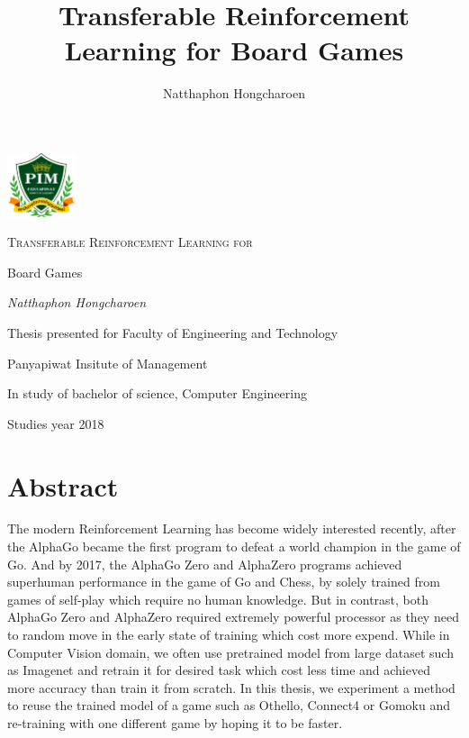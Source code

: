 \documentclass[12pt,a4paper]{article}
\title{Transferable Reinforcement Learning for Board Games}
\author{Natthaphon Hongcharoen}
\begin{document}

\begin{titlepage}
	\centering
	\includegraphics[width=0.15\textwidth]{logo.png}\par\vspace{1cm}
	{\scshape\Huge Transferable Reinforcement Learning for \par Board Games\par}
	\vfill
	{\Large\itshape Natthaphon Hongcharoen\par}
	\vfill
	{\Large  \par}
	{\large Thesis presented for Faculty of Engineering and Technology \par\vspace{0.1cm}}
	{\large Panyapiwat Insitute of Management\par\vspace{0.1cm}}
	{\large In study of bachelor of science, Computer Engineering
	}


	{\large Studies year 2018 \par}
\end{titlepage}

\clearpage %
\pagestyle{empty}  %

\section*{Abstract}
\tab\hspace{0.3cm}The modern Reinforcement Learning has become widely interested recently, after the AlphaGo\cite{AlphaGo} became the first program to defeat a world champion in the game of Go. And by 2017, the AlphaGo Zero\cite{AlphaGoZero} and AlphaZero\cite{AlphaZero} programs achieved superhuman performance in the game of Go and Chess, by solely trained from games of self-play which require no human knowledge. But in contrast, both AlphaGo Zero and AlphaZero required extremely powerful processor as they need to random move in the early state of training which cost more expend. While in Computer Vision domain, we often use pretrained model from large dataset such as Imagenet\cite{Imagenet} and retrain it for desired task which cost less time and achieved more accuracy than train it from scratch. In this thesis, we experiment a method to reuse the trained model of a game such as Othello, Connect4 or Gomoku and re-training with one different game by hoping it to be faster.
\clearpage
\end{document}

